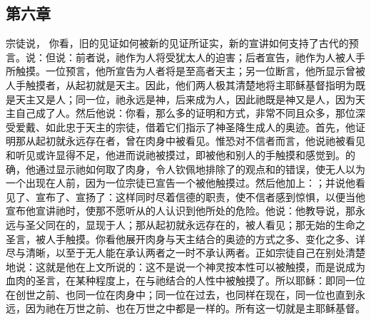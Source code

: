 
\subsection{第六章}

\par

宗徒说， 你看，旧的见证如何被新的见证所证实，新的宣讲如何支持了古代的预言。说：但说：前者说，祂作为人将受犹太人的迫害；后者宣告，祂作为人被人手所触摸。一位预言，他所宣告为人者将是至高者天主；另一位断言，他所显示曾被人手触摸者，从起初就是天主。因此，他们两人极其清楚地将主耶稣基督指明为既是天主又是人；同一位，祂永远是神，后来成为人，因此祂既是神又是人，因为天主自己成了人。然后他说：你看，那么多的证明和方式，非常不同且众多，那位深受爱戴、如此忠于天主的宗徒，借着它们指示了神圣降生成人的奥迹。首先，他证明那从起初就永远存在者，曾在肉身中被看见。惟恐对不信者而言，他说祂被看见和听见或许显得不足，他进而说祂被摸过，即被他和别人的手触摸和感觉到。的确，他通过显示祂如何取了肉身，令人钦佩地排除了的观点和的错误，使无人以为一个出现在人前，因为一位宗徒已宣告一个被他触摸过。然后他加上：；并说他看见了、宣布了、宣扬了：这样同时尽着信德的职责，使不信者感到惊惧，以便当他宣布他宣讲祂时，使那不愿听从的人认识到他所处的危险。他说：他教导说，那永远与圣父同在的，显现于人；那从起初就永远存在的，被人看见；那无始的生命之圣言，被人手触摸。你看他展开肉身与天主结合的奥迹的方式之多、变化之多、详尽与清晰，以至于无人能在承认两者之一时不承认两者。正如宗徒自己在别处清楚地说：这就是他在上文所说的：这不是说一个神灵按本性可以被触摸，而是说成为血肉的圣言，在某种程度上，在与祂结合的人性中被触摸了。所以耶稣：即同一位在创世之前、也同一位在肉身中；同一位在过去，也同样在现在，同一位也直到永远，因为祂在万世之前、也在万世之中都是一样的。所有这一切就是主耶稣基督。\par

